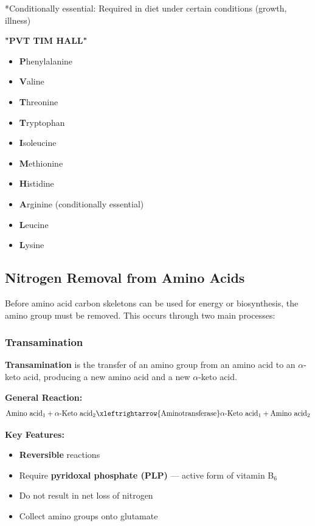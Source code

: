 *Conditionally essential: Required in diet under certain conditions (growth, illness)
\begin{tcolorbox}[colback=blue!5, colframe=blue!70!black, title=\textbf{Mnemonic for Essential Amino Acids}]
\textbf{"PVT TIM HALL"}
\begin{itemize}
    \item \textbf{P}henylalanine
    \item \textbf{V}aline
    \item \textbf{T}hreonine
    \item \textbf{T}ryptophan
    \item \textbf{I}soleucine
    \item \textbf{M}ethionine
    \item \textbf{H}istidine
    \item \textbf{A}rginine (conditionally essential)
    \item \textbf{L}eucine
    \item \textbf{L}ysine
\end{itemize}
\end{tcolorbox}

\subsection{Nitrogen Removal from Amino Acids}

Before amino acid carbon skeletons can be used for energy or biosynthesis, the amino group must be removed. This occurs through two main processes:

\subsubsection{Transamination}

\begin{definition}
\textbf{Transamination} is the transfer of an amino group from an amino acid to an $\alpha$-keto acid, producing a new amino acid and a new $\alpha$-keto acid.
\end{definition}

\textbf{General Reaction:}
\[
\text{Amino acid}_1 + \alpha\text{-Keto acid}_2 \xleftrightarrow{\text{Aminotransferase}} \alpha\text{-Keto acid}_1 + \text{Amino acid}_2
\]

\textbf{Key Features:}
\begin{itemize}
    \item \textbf{Reversible} reactions
    \item Require \textbf{pyridoxal phosphate (PLP)} — active form of vitamin B$_6$
    \item Do not result in net loss of nitrogen
    \item Collect amino groups onto glutamate
\end{itemize}

